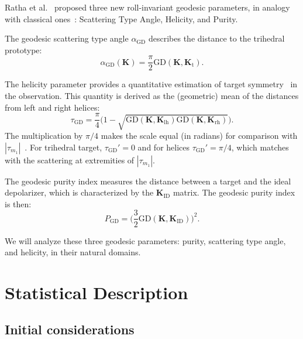 \documentclass[journal]{IEEEtran}
\begin{document}
{Ratha et al.~\cite{APolSARScatteringPowerFactorizationFrameworkandNovelRollInvariantParametersBasedUnsupervisedClassificationSchemeUsingaGeodesicDistanceinpress} proposed three new roll-invariant geodesic parameters, in analogy with classical ones~\cite{CloudePottier:97,Touzi:TGARS:2007}: Scattering Type Angle, Helicity, and Purity.

The geodesic scattering type angle $\alpha_{\text{GD}}$ describes 
the distance to the trihedral prototype:
\begin{equation}
	\alpha_{\text{GD}}(\bm{K}) = \frac{\pi}{2}  \text{GD}(\bm{K},\bm{K}_{\text{t}}).
\end{equation}

The helicity parameter provides a quantitative estimation of target symmetry~\cite{Touzi:TGARS:2007} in the observation. 
This quantity is derived as the (geometric) mean of the distances from left and right helices:
\begin{equation}
	\tau_{\text{GD}} = \frac\pi4 \big(1 - \sqrt{\text{GD}(\bm{K},\bm{K}_{\text{lh}})\text{GD}(\bm{K},\bm{K}_{\text{rh}})}\big).
\end{equation}
The multiplication by $\pi/4$ makes the scale equal (in radians) for comparison with $|\tau_{m_1}|$~\cite{Touzi:TGARS:2007}. 
For trihedral target, $\tau_{\text{GD}}' = 0$ and for helices $\tau_{\text{GD}}' = \pi/4$, which matches with the scattering at extremities of $|\tau_{m_1}|$.

The geodesic purity index measures the distance between a target and the ideal depolarizer, which is characterized by the $\bm{K}_{\text{ID}}$ matrix.
The geodesic purity index is then:
\begin{equation}
	P_{\text{GD}} = \Big(\frac{3}{2}\text{GD}(\bm{K}, \bm{K}_{\text{ID}})\Big)^2.
\end{equation}

We will analyze these three geodesic parameters:
purity, scattering type angle, and helicity, in their natural domains.

\section{Statistical Description}

\subsection{Initial considerations}

}
\end{document}
